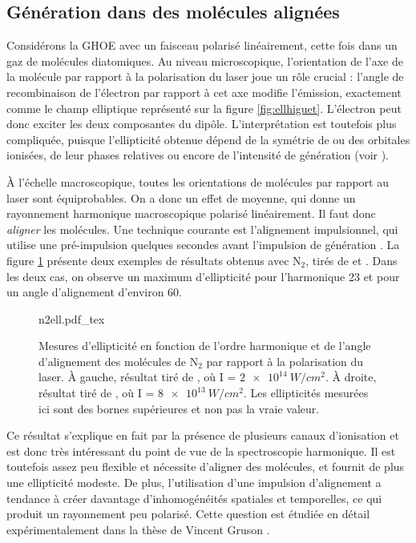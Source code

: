 \subsection{Génération dans des molécules alignées}
Considérons la GHOE avec un faisceau polarisé linéairement, cette fois dans un gaz de molécules diatomiques. Au niveau microscopique, l'orientation de l'axe de la molécule par rapport à la polarisation du laser joue un rôle crucial : l'angle de recombinaison de l'électron par rapport à cet axe modifie l'émission, exactement comme le champ elliptique représenté sur la figure \ref{fig:ellhiguet}. L'électron peut donc exciter les deux composantes du dipôle. L'interprétation est toutefois plus compliquée, puisque l'ellipticité obtenue dépend de la symétrie de ou des orbitales ionisées, de leur phases relatives ou encore de l'intensité de génération (voir ). \par
\`{A} l'échelle macroscopique, toutes les orientations de molécules par rapport au laser sont équiprobables. On a donc un effet de moyenne, qui donne un rayonnement harmonique macroscopique polarisé linéairement. Il faut donc \textit{aligner} les molécules. Une technique courante est l'alignement impulsionnel, qui utilise une pré-impulsion quelques secondes avant l'impulsion de génération . La figure \ref{fig:n2ell} présente deux exemples de résultats obtenus avec $\text{N}_\text{2}$, tirés de  et . Dans les deux cas, on observe un maximum d'ellipticité pour l'harmonique 23 et pour un angle d'alignement d'environ 60\degres.

\begin{figure}[!ht]
\centering
\def\svgwidth{1\columnwidth}
{n2ell.pdf_tex}
\caption{Mesures d'ellipticité en fonction de l'ordre harmonique et de l'angle d'alignement des molécules de $\text{N}_\text{2}$ par rapport à la polarisation du laser. \`{A} gauche, résultat tiré de , où I = $\SI{2e14}{W/cm^2}$. \`{A} droite, résultat tiré de , où I = $\SI{8e13}{W/cm^2}$. Les ellipticités mesurées ici sont des bornes supérieures et non pas la vraie valeur.}
\label{fig:n2ell}
\end{figure}

Ce résultat s'explique en fait par la présence de plusieurs canaux d'ionisation et est donc très intéressant du point de vue de la spectroscopie harmonique. Il est toutefois assez peu flexible et nécessite d'aligner des molécules, et fournit de plus une ellipticité modeste. De plus, l'utilisation d'une impulsion d'alignement a tendance à créer davantage d'inhomogénéités spatiales et temporelles, ce qui produit un rayonnement peu polarisé. Cette question est étudiée en détail expérimentalement dans la thèse de Vincent Gruson .


